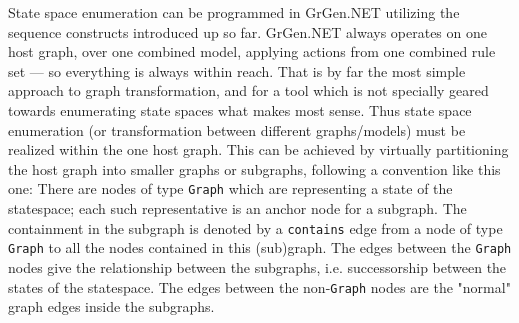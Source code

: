 State space enumeration can be programmed in GrGen.NET utilizing the sequence constructs introduced up so far.
GrGen.NET always operates on one host graph, over one combined model, applying actions from one combined rule set --- so everything is always within reach.
That is by far the most simple approach to graph transformation, and for a tool which is not specially geared towards enumerating state spaces what makes most sense.
Thus state space enumeration (or transformation between different graphs/models) must be realized within the one host graph.
This can be achieved by virtually partitioning the host graph into smaller graphs or subgraphs, following a convention like this one:
There are nodes of type \texttt{Graph} which are representing a state of the statespace; each such representative is an anchor node for a subgraph.
The containment in the subgraph is denoted by a \texttt{contains} edge from a node of type \texttt{Graph} to all the nodes contained in this (sub)graph.
The edges between the \texttt{Graph} nodes give the relationship between the subgraphs, i.e. successorship between the states of the statespace.
The edges between the non-\texttt{Graph} nodes are the "normal" graph edges inside the subgraphs.


